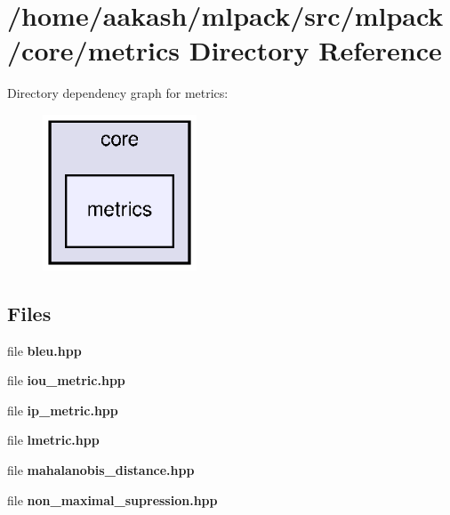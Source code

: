 \section{/home/aakash/mlpack/src/mlpack/core/metrics Directory Reference}
\label{dir_4efb564a11712fe6ab1802c27ccee872}
Directory dependency graph for metrics\+:
\nopagebreak
\begin{figure}[H]
\begin{center}
\leavevmode
\includegraphics[width=130pt]{dir_4efb564a11712fe6ab1802c27ccee872_dep}
\end{center}
\end{figure}
\subsection*{Files}
\begin{DoxyCompactItemize}
\item 
file \textbf{ bleu.\+hpp}
\item 
file \textbf{ iou\+\_\+metric.\+hpp}
\item 
file \textbf{ ip\+\_\+metric.\+hpp}
\item 
file \textbf{ lmetric.\+hpp}
\item 
file \textbf{ mahalanobis\+\_\+distance.\+hpp}
\item 
file \textbf{ non\+\_\+maximal\+\_\+supression.\+hpp}
\end{DoxyCompactItemize}
